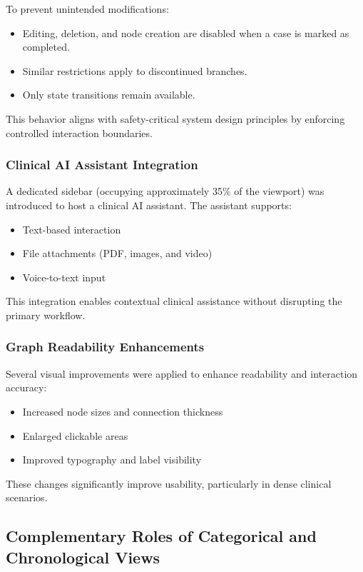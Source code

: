 \documentclass{article}
\begin{document}
To prevent unintended modifications:
\begin{itemize}
    \item Editing, deletion, and node creation are disabled when a case is marked as completed.
    \item Similar restrictions apply to discontinued branches.
    \item Only state transitions remain available.
\end{itemize}

This behavior aligns with safety-critical system design principles by enforcing controlled interaction boundaries.

\subsubsection{Clinical AI Assistant Integration}

A dedicated sidebar (occupying approximately 35\% of the viewport) was introduced to host a clinical AI assistant. The assistant supports:
\begin{itemize}
    \item Text-based interaction
    \item File attachments (PDF, images, and video)
    \item Voice-to-text input
\end{itemize}

This integration enables contextual clinical assistance without disrupting the primary workflow.

\subsubsection{Graph Readability Enhancements}

Several visual improvements were applied to enhance readability and interaction accuracy:
\begin{itemize}
    \item Increased node sizes and connection thickness
    \item Enlarged clickable areas
    \item Improved typography and label visibility
\end{itemize}

These changes significantly improve usability, particularly in dense clinical scenarios.


\subsection{Complementary Roles of Categorical and Chronological Views}
\end{document}
